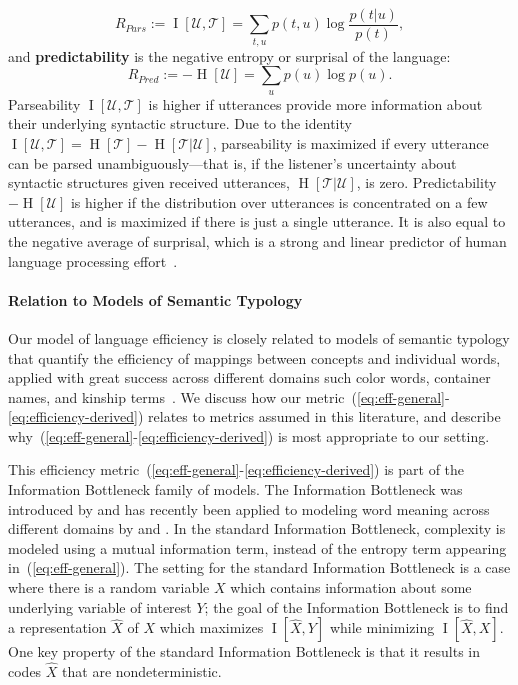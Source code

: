 \documentclass[10pt,twoside,lineno]{article}
\newcommand{\key}[1]{\textbf{#1}}
\newcommand{\utterance}{\mathcal{U}}
\newcommand{\tree}{\mathcal{T}}
\begin{document}
\begin{equation}
	R_{Pars} := \operatorname{I}[\utterance,\tree] = \sum_{t,u} p(t,u) \log \frac{p(t|u)}{p(t)},
\end{equation}
and \key{predictability} is the negative entropy or surprisal of the language:
\begin{equation}
	R_{Pred} := - \operatorname{H}[\utterance] = \sum_{u} p(u) \log p(u).
\end{equation}
Parseability $\operatorname{I}[\utterance,\tree]$ is higher if utterances provide more information about their underlying syntactic structure.
Due to the identity $\operatorname{I}[\utterance, \tree] = \operatorname{H}[\tree] - \operatorname{H}[\tree|\utterance]$, parseability is maximized if every utterance can be parsed unambiguously---that is, if the listener's uncertainty about syntactic structures given received utterances, $\operatorname{H}[\tree|\utterance]$, is zero.
Predictability $- \operatorname{H}[\utterance]$ is higher if the distribution over utterances is concentrated on a few utterances, and is maximized if there is just a single utterance.
It is also equal to the negative average of surprisal, which is a strong and linear predictor of human language processing effort~\cite{hale2001probabilistic,levy2008expectation,smith2013effect}.


\paragraph{Relation to Models of Semantic Typology}
Our model of language efficiency is closely related to models of semantic typology that quantify the efficiency of mappings between concepts and individual words, applied with great success across different domains such color words, container names, and kinship terms~\cite{kemp2012kinship,xu2014numeral,regier2015word,xu2016historical,zaslavsky2018efficient,zaslavsky2019semantic}.
We discuss how our metric~(\ref{eq:eff-general}-\ref{eq:efficiency-derived}) relates to metrics assumed in this literature, and describe why~(\ref{eq:eff-general}-\ref{eq:efficiency-derived}) is most appropriate to our setting.

This efficiency metric~(\ref{eq:eff-general}-\ref{eq:efficiency-derived}) is part of the Information Bottleneck family of models.
The Information Bottleneck was introduced by \citet{tishby1999information} and has recently been applied to modeling word meaning across different domains by \citet{zaslavsky2018efficient} and \citet{zaslavsky2019semantic}.
In the standard Information Bottleneck, complexity is modeled using a mutual information term, instead of the entropy term appearing in~(\ref{eq:eff-general}).
The setting for the standard Information Bottleneck is a case where there is a random variable $X$ which contains information about some underlying variable of interest $Y$; the goal of the Information Bottleneck is to find a representation $\hat{X}$ of $X$ which maximizes $\operatorname{I}[\hat{X},Y]$ while minimizing $\operatorname{I}[\hat{X},X]$.
One key property of the standard Information Bottleneck is that it results in codes $\hat{X}$ that are nondeterministic.
\end{document}
